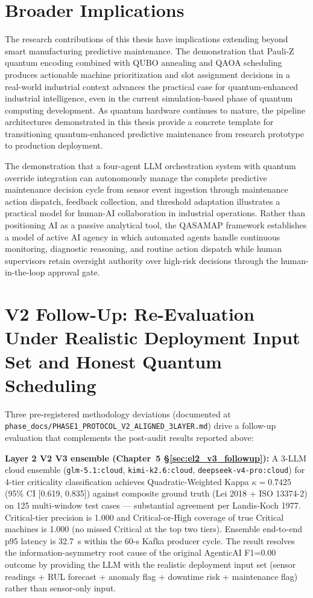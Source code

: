 \section{Broader Implications}

The research contributions of this thesis have implications extending beyond smart manufacturing predictive maintenance. The demonstration that Pauli-Z quantum encoding combined with QUBO annealing and QAOA scheduling produces actionable machine prioritization and slot assignment decisions in a real-world industrial context advances the practical case for quantum-enhanced industrial intelligence, even in the current simulation-based phase of quantum computing development. As quantum hardware continues to mature, the pipeline architectures demonstrated in this thesis provide a concrete template for transitioning quantum-enhanced predictive maintenance from research prototype to production deployment.

The demonstration that a four-agent LLM orchestration system with quantum override integration can autonomously manage the complete predictive maintenance decision cycle from sensor event ingestion through maintenance action dispatch, feedback collection, and threshold adaptation illustrates a practical model for human-AI collaboration in industrial operations. Rather than positioning AI as a passive analytical tool, the QASAMAP framework establishes a model of active AI agency in which automated agents handle continuous monitoring, diagnostic reasoning, and routine action dispatch while human supervisors retain oversight authority over high-risk decisions through the human-in-the-loop approval gate.

\section{V2 Follow-Up: Re-Evaluation Under Realistic Deployment Input Set and Honest Quantum Scheduling}
\label{sec:v2_followup_conclusion}

Three pre-registered methodology deviations (documented at \texttt{phase\_docs/PHASE1\_PROTOCOL\_V2\_ALIGNED\_3LAYER.md}) drive a follow-up evaluation that complements the post-audit results reported above:

\textbf{Layer 2 V2 V3 ensemble (Chapter~5 §\ref{sec:el2_v3_followup}):} A 3-LLM cloud ensemble (\texttt{glm-5.1:cloud}, \texttt{kimi-k2.6:cloud}, \texttt{deepseek-v4-pro:cloud}) for 4-tier criticality classification achieves Quadratic-Weighted Kappa $\kappa = 0.7425$ (95\% CI [0.619, 0.835]) against composite ground truth (Lei 2018 + ISO 13374-2) on 125 multi-window test cases --- substantial agreement per Landis-Koch 1977. Critical-tier precision is 1.000 and Critical-or-High coverage of true Critical machines is 1.000 (no missed Critical at the top two tiers). Ensemble end-to-end p95 latency is 32.7~s within the 60-s Kafka producer cycle. The result resolves the information-asymmetry root cause of the original AgenticAI F1=0.00 outcome by providing the LLM with the realistic deployment input set (sensor readings + RUL forecast + anomaly flag + downtime risk + maintenance flag) rather than sensor-only input.

